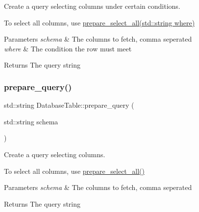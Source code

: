 Create a query selecting columns under certain conditions. 

To select all columns, use \hyperlink{class_database_table_abbb3c9bf537c1a2d3227661fec817432}{prepare\+\_\+select\+\_\+all(std\+::string where)}


\begin{DoxyParams}{Parameters}
{\em schema} & The columns to fetch, comma seperated \\
\hline
{\em where} & The condition the row must meet \\
\hline
\end{DoxyParams}
\begin{DoxyReturn}{Returns}
The query string 
\end{DoxyReturn}
\mbox{\label{class_database_table_a9478ff6a4d02787fabbfbd7f3e970fc0}} 
\subsubsection{\texorpdfstring{prepare\+\_\+query()}{prepare\_query()}\hspace{0.1cm}{\footnotesize\ttfamily [2/2]}}
{\footnotesize\ttfamily std\+::string Database\+Table\+::prepare\+\_\+query (\begin{DoxyParamCaption}\item[{std\+::string}]{schema }\end{DoxyParamCaption})}



Create a query selecting columns. 

To select all columns, use \hyperlink{class_database_table_ade634681afae1d6dec558c049eb907a9}{prepare\+\_\+select\+\_\+all()}


\begin{DoxyParams}{Parameters}
{\em schema} & The columns to fetch, comma seperated \\
\hline
\end{DoxyParams}
\begin{DoxyReturn}{Returns}
The query string 
\end{DoxyReturn}
\mbox{\label{class_database_table_abbb3c9bf537c1a2d3227661fec817432}} 

